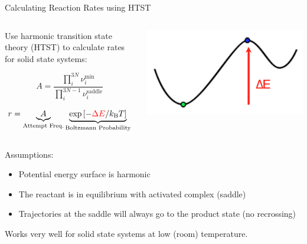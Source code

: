 \documentclass[onlymath]{beamer}
\begin{document}
\begin{frame}{Calculating Reaction Rates using HTST}

  \begin{columns}
    \begin{column}[l]{0.6\textwidth}
      Use harmonic transition state theory (HTST) to calculate rates for solid state
      systems:

      \[
        A = \frac{\prod_i^{3N} \nu_i^\text{min}}{\prod_i^{3N-1} \nu_i^\text{saddle}} 
      \]

      \[
        r = \underbrace{A}_{\textrm{Attempt Freq.}} 
        \underbrace{\exp \left[ -{\color{red}\Delta E}/k_\text{B} T \right]}_{\textrm{Boltzmann Probability}} 
      \]
    \end{column}

    \begin{column}[r]{0.4\textwidth}
      \includegraphics[width=1.0\textwidth]{images/barrier.png}
    \end{column}
  \end{columns}

  \vspace{2mm}

  Assumptions:
  \begin{itemize}
    \item Potential energy surface is harmonic
    \item The reactant is in equilibrium with activated complex (saddle)
    \item Trajectories at the saddle will always go to the product state (no recrossing)
  \end{itemize}
  
  Works very well for solid state systems at low (room) temperature.

\end{frame}
\end{document}
